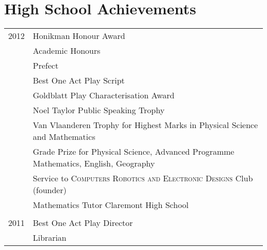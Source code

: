 \section{High School Achievements}
\begin{tabular}{R{1cm}|l}
2012 & Honikman Honour Award\\
& Academic Honours\\
& Prefect\\
& Best One Act Play Script\\
& Goldblatt Play Characterisation Award\\
& Noel Taylor Public Speaking Trophy\\
& Van Vlaanderen Trophy for Highest Marks in Physical Science and Mathematics\\
& Grade Prize for Physical Science, Advanced Programme Mathematics, English, Geography\\
& Service to \textsc{Computers Robotics and Electronic Designs} Club (founder)\\
& Mathematics Tutor Claremont High School\\
&\\
2011& Best One Act Play Director\\
& Librarian\\

\end{tabular}

